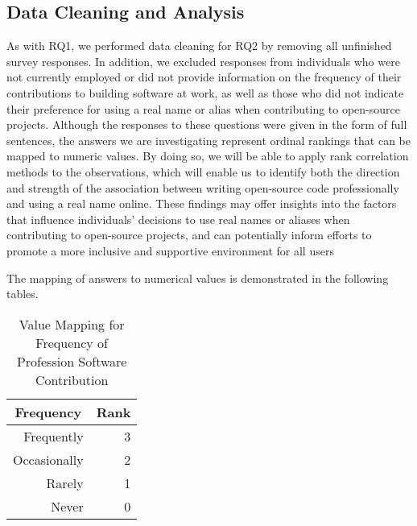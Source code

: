 \documentclass[journal,12pt,onecolumn,]{IEEEtran}
\begin{document}
\subsection{Data Cleaning and Analysis}
As with RQ1, we performed data cleaning for RQ2 by removing all unfinished survey responses. 
In addition, we excluded responses from individuals who were not currently employed or did not provide information on the frequency of their contributions to building software at work, 
as well as those who did not indicate their preference for using a real name or alias when contributing to open-source projects. 
Although the responses to these questions were given in the form of full sentences, the answers we are investigating represent ordinal rankings that can be mapped to numeric values. 
By doing so, we will be able to apply rank correlation methods to the observations, which will enable us to identify both the direction and strength of the association between writing open-source code professionally and using a real name online. 
These findings may offer insights into the factors that influence individuals' decisions to use real names or aliases when contributing to open-source projects, and can potentially inform efforts to promote a more inclusive and supportive environment for all users

The mapping of answers to numerical values is demonstrated in the following tables.

\begin{table}[h]
    \centering
    \caption{Value Mapping for Frequency of Profession Software Contribution}
    \begin{tabular}{|r|r|}
        \hline
        \multicolumn{1}{|c|}{\textbf{Frequency}} & \multicolumn{1}{c|}{\textbf{Rank}} \\ \hline
        Frequently                              & 3                                  \\ \hline
        Occasionally                            & 2                                  \\ \hline
        Rarely                                  & 1                                  \\ \hline
        Never                                   & 0                                  \\ \hline
    \end{tabular}
\end{table}
\end{document}

